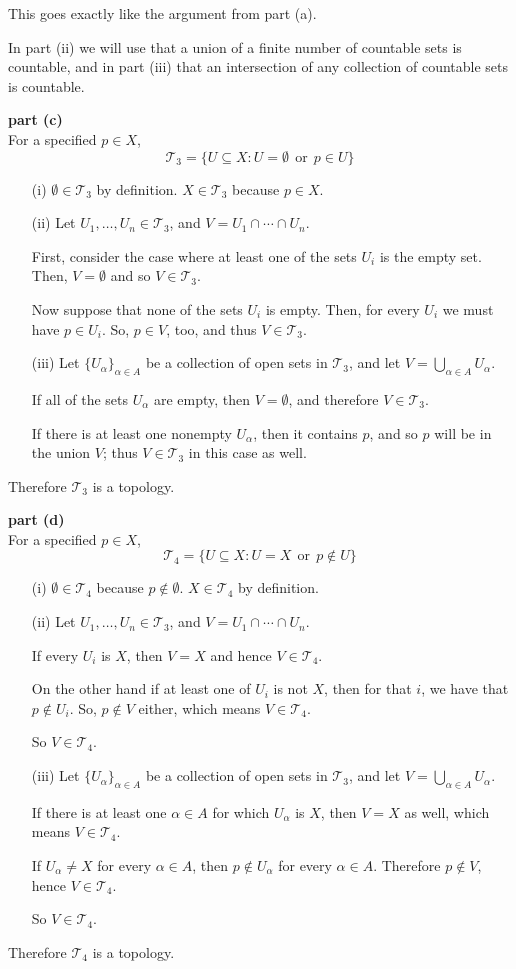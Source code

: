 \documentclass{homework}
\newcommand{\Tau}{\ensuremath{\mathcal{T}}}
\newcommand{\OR}{\ensuremath{\ \ \text{or}\ \ }}
\begin{document}
This goes exactly like the argument from part (a).

In part (ii)
we will use that a union of a finite number of countable sets is countable,
and in part (iii) that an intersection of any collection of countable
sets is countable.

\textbf{part (c)}\\
For a specified $p\in X$,
$$ \Tau_3 = \{ U \subseteq X : U=\emptyset \OR p\in U\} $$

\begin{itemize}
\item[(i)] $\emptyset\in\Tau_3$ by definition.  $X\in\Tau_3$ because
$p\in X$.
\item[(ii)] Let $U_1,\ldots,U_n\in\Tau_3$, and $V=U_1\cap\cdots\cap U_n$.

First, consider the case where at least one of the sets $U_i$ is the empty set.
Then, $V=\emptyset$ and so $V\in\Tau_3$.

Now suppose that none of the sets $U_i$ is empty.
Then, for every $U_i$ we must have $p\in U_i$.  So, $p\in V$, too,
and thus $V\in\Tau_3$.
\item[(iii)] Let $\{U_\alpha\}_{\alpha\in A}$ be a collection
of open sets in $\Tau_3$, and let $V=\bigcup_{\alpha\in A} U_\alpha$.

If all of the sets $U_\alpha$ are empty, then $V=\emptyset$, and
therefore $V\in\Tau_3$.

If there is at least one nonempty $U_\alpha$, then it contains $p$,
and so $p$ will be in the union $V$; thus $V\in\Tau_3$ in this case
as well.
\end{itemize}
Therefore $\Tau_3$ is a topology.

\textbf{part (d)}\\
For a specified $p\in X$,
$$ \Tau_4 = \{ U \subseteq X : U=X \OR p\not\in U\} $$

\begin{itemize}
\item[(i)] $\emptyset\in\Tau_4$ because $p\not\in\emptyset$. $X\in\Tau_4$
by definition.
\item[(ii)] Let $U_1,\ldots,U_n\in\Tau_3$, and $V=U_1\cap\cdots\cap U_n$.

If every $U_i$ is $X$, then $V=X$ and hence $V\in\Tau_4$.

On the other hand if at least
one of $U_i$ is not $X$, then for that $i$, we have that $p\not\in U_i$.
So, $p\not\in V$ either, which means $V\in\Tau_4$.

So $V\in\Tau_4$.
\item[(iii)] Let $\{U_\alpha\}_{\alpha\in A}$ be a collection
of open sets in $\Tau_3$, and let $V=\bigcup_{\alpha\in A} U_\alpha$.

If there is at least one $\alpha\in A$ for which $U_\alpha$ is $X$,
then $V=X$ as well, which means $V\in\Tau_4$.

If $U_\alpha \ne X$ for every $\alpha\in A$, then $p\not\in U_\alpha$ for
every $\alpha\in A$.  Therefore $p\not\in V$, hence $V\in\Tau_4$.

So $V\in\Tau_4$.
\end{itemize}
Therefore $\Tau_4$ is a topology.
\end{document}
